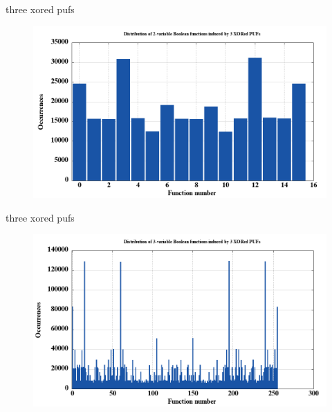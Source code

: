 \documentclass[10pt, compress]{beamer}
\begin{document}
\begin{frame}{three xored pufs}
    \begin{figure}
        \centering
        \includegraphics[width=\textwidth]{figures/dist/distribution_of_2-variable_boolean_functions_induced_by_3_xored_pufs.png}
    \end{figure}
\end{frame}

\begin{frame}{three xored pufs}
    \begin{figure}
        \centering
        \includegraphics[width=\textwidth]{figures/dist/distribution_of_3-variable_boolean_functions_induced_by_3_xored_pufs.png}
    \end{figure}
\end{frame}
\end{document}
